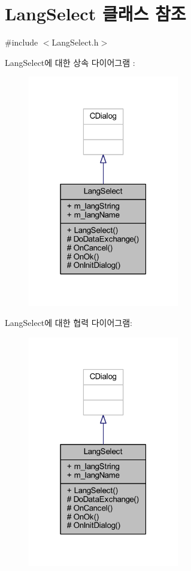 \hypertarget{class_lang_select}{}\section{Lang\+Select 클래스 참조}
\label{class_lang_select}


{\ttfamily \#include $<$Lang\+Select.\+h$>$}



Lang\+Select에 대한 상속 다이어그램 \+: \nopagebreak
\begin{figure}[H]
\begin{center}
\leavevmode
\includegraphics[width=187pt]{class_lang_select__inherit__graph}
\end{center}
\end{figure}


Lang\+Select에 대한 협력 다이어그램\+:\nopagebreak
\begin{figure}[H]
\begin{center}
\leavevmode
\includegraphics[width=187pt]{class_lang_select__coll__graph}
\end{center}
\end{figure}

